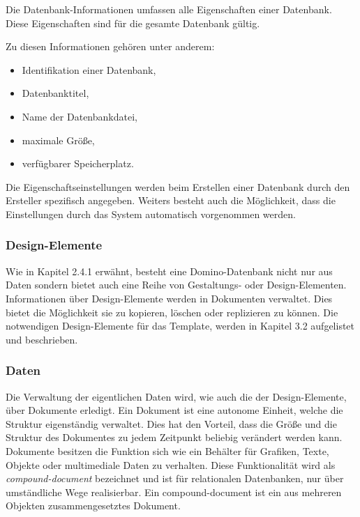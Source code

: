 Die Datenbank-Informationen umfassen alle Eigenschaften einer Datenbank. Diese \linebreak Eigenschaften sind für die gesamte Datenbank gültig.
\begin{flushleft}
Zu diesen Informationen gehören unter anderem:
\end{flushleft}
\begin{itemize}
\item Identifikation einer  Datenbank,
\item Datenbanktitel,
\item Name der Datenbankdatei,
\item maximale Größe,
\item verfügbarer Speicherplatz. 
\end{itemize}
Die Eigenschaftseinstellungen werden beim Erstellen einer Datenbank durch den Ersteller \linebreak spezifisch angegeben. 
Weiters besteht auch die Möglichkeit, dass die Einstellungen durch das System automatisch vorgenommen werden.

\subsubsection{Design-Elemente}
\label{sec:3dominoDB}

Wie in Kapitel 2.4.1 erwähnt, besteht eine Domino-Datenbank nicht nur aus Daten sondern bietet auch eine Reihe von Gestaltungs- oder Design-Elementen.
Informationen über Design-Elemente werden in Dokumenten verwaltet. Dies bietet die Möglichkeit sie zu kopieren, löschen oder replizieren zu
können. Die notwendigen Design-Elemente für das Template, werden in Kapitel 3.2 aufgelistet und beschrieben. 


\subsubsection{Daten}
\label{sec:3dominoDB}

Die Verwaltung der eigentlichen Daten wird, wie auch die der Design-Elemente, über \linebreak Dokumente erledigt. 
Ein Dokument ist eine autonome Einheit, welche die Struktur eigenständig verwaltet. Dies hat den Vorteil, dass die Größe und die Struktur des 
Dokumentes zu jedem Zeitpunkt beliebig verändert werden kann. Dokumente besitzen die Funktion sich wie ein Behälter für Grafiken, Texte, Objekte
oder multimediale Daten zu verhalten. Diese Funktionalität wird als \textit{compound-document} bezeichnet und ist für relationalen Datenbanken,
nur über umständliche Wege realisierbar. Ein compound-document ist ein aus mehreren Objekten zusammengesetztes Dokument\cite{wind}. 

